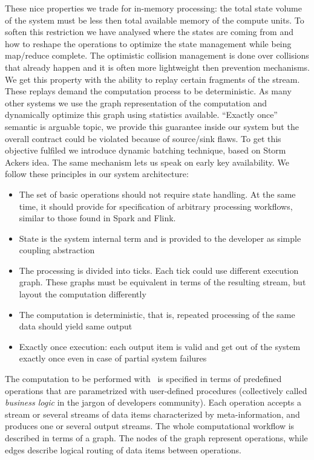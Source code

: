 These nice properties we trade for in-memory processing: the total state volume of the system must be less then total available memory of the compute units. To soften this restriction we have analysed where the states are coming from and how to reshape the operations to optimize the state management while being map/reduce complete. The optimistic collision management is done over collisions that already happen and it is often more lightweight then prevention mechanisms. We get this property with the ability to replay certain fragments of the stream. These replays demand the computation process to be deterministic. As many other systems we use the graph representation of the computation and dynamically optimize this graph using statistics available. ``Exactly once'' semantic is arguable topic, we provide this guarantee inside our system but the overall contract could be violated because of source/sink flaws. To get this objective fulfiled we introduce dynamic batching technique, based on Storm Ackers idea. The same mechanism lets us speak on early key availability. We follow these principles in our system architecture:
\begin{itemize}
\item The set of basic operations should not require state handling. At the same time, it should provide for specification of arbitrary processing workflows, similar to those found in Spark and Flink.
\item State is the system internal term and is provided to the developer as simple coupling abstraction
\item The processing is divided into ticks. Each tick could use different execution graph. These graphs must be equivalent in terms of the resulting stream, but layout the computation differently
\item The computation is deterministic, that is, repeated processing of the same data should yield same output
\item Exactly once execution: each output item is valid and get out of the system exactly once even in case of partial system failures
\end{itemize}

The computation to be performed with \FlameStream ~is specified in terms of predefined operations that are parametrized with user-defined procedures (collectively called {\em business logic} in the jargon of developers community). Each operation accepts a stream or several streams of data items characterized by meta-information, and produces one or several output streams. The whole computational workflow is described in terms of a graph. The nodes of the graph represent operations, while edges describe logical routing of data items between operations.

